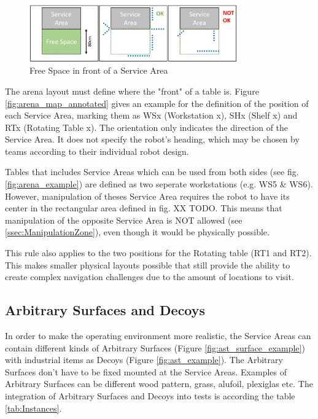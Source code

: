 \begin{figure} [h!]
	\centering
	\includegraphics[width= 0.8\textwidth ]{./images/general_rules/arena_service_area_free_space}
	\caption{Free Space in front of a Service Area}
	\label{fig:arena_service_area_free}
\end{figure}

The arena layout must define where the "front" of a table is.
Figure \ref{fig:arena_map_annotated} gives an example for the definition of the position of each Service Area, marking them as WSx (Workstation x), SHx (Shelf x) and RTx (Rotating Table x). The orientation only indicates the direction of the Service Area. It does not specify the robot's heading, which may be chosen by teams according to their individual robot design.

Tables that includes Service Areas which can be used from both sides (see fig. \ref{fig:arena_example}) are defined as two seperate workstations (e.g. WS5 \& WS6). However, manipulation of theses Service Area requires the robot to have its center in the rectangular area defined in fig. XX TODO. This means that manipulation of the opposite Service Area is NOT allowed (see \ref{ssec:ManipulationZone}), even though it would be physically possible.

This rule also applies to the two positions for the Rotating table (RT1 and RT2).
This makes smaller physical layouts possible that still provide the ability to create complex navigation challenges due to the amount of locations to visit.


\subsection{Arbitrary Surfaces and Decoys}
\label{subsec:Arbitrary_Surfaces_and_Decoys}

In order to make the operating environment more realistic, the Service Areas can contain different kinds of Arbitrary Surfaces (Figure \ref{fig:ast_surface_example}) with industrial items as Decoys (Figure \ref{fig:ast_example}). The Arbitrary Surfaces don't have to be fixed mounted at the Service Areas. Examples of Arbitrary Surfaces can be different wood pattern, grass, alufoil, plexiglas etc. The integration of Arbitrary Surfaces and Decoys into tests is according the table \ref{tab:Instances}.

